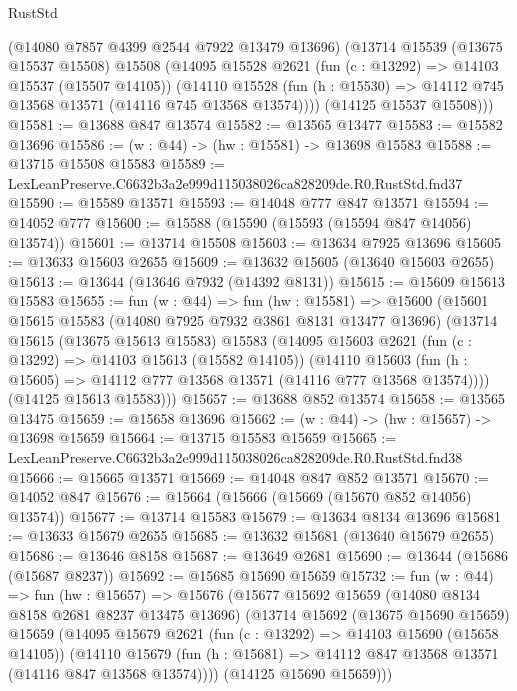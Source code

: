 \begin{lexlean}{RustStd}
\begin{coremodule}
      (@14080 @7857 @4399 @2544 @7922 @13479 @13696)
      (@13714
        @15539
        (@13675 @15537 @15508)
        @15508
        (@14095
          @15528
          @2621
          (fun (c : @13292) => @14103 @15537 (@15507 @14105))
          (@14110
            @15528
            (fun (h : @15530) => @14112 @745 @13568 @13571 (@14116 @745 @13568 @13574))))
        (@14125 @15537 @15508)))
@15581 := @13688 @847 @13574
@15582 := @13565 @13477
@15583 := @15582 @13696
@15586 := (w : @44) -> (hw : @15581) -> @13698 @15583
@15588 := @13715 @15508 @15583
@15589 := LexLeanPreserve.C6632b3a2e999d115038026ca828209de.R0.RustStd.fnd37
@15590 := @15589 @13571
@15593 := @14048 @777 @847 @13571
@15594 := @14052 @777
@15600 := @15588 (@15590 (@15593 (@15594 @847 @14056) @13574))
@15601 := @13714 @15508
@15603 := @13634 @7925 @13696
@15605 := @13633 @15603 @2655
@15609 := @13632 @15605 (@13640 @15603 @2655)
@15613 := @13644 (@13646 @7932 (@14392 @8131))
@15615 := @15609 @15613 @15583
@15655 := fun (w : @44) =>
  fun (hw : @15581) =>
  @15600
    (@15601
      @15615
      @15583
      (@14080 @7925 @7932 @3861 @8131 @13477 @13696)
      (@13714
        @15615
        (@13675 @15613 @15583)
        @15583
        (@14095
          @15603
          @2621
          (fun (c : @13292) => @14103 @15613 (@15582 @14105))
          (@14110
            @15603
            (fun (h : @15605) => @14112 @777 @13568 @13571 (@14116 @777 @13568 @13574))))
        (@14125 @15613 @15583)))
@15657 := @13688 @852 @13574
@15658 := @13565 @13475
@15659 := @15658 @13696
@15662 := (w : @44) -> (hw : @15657) -> @13698 @15659
@15664 := @13715 @15583 @15659
@15665 := LexLeanPreserve.C6632b3a2e999d115038026ca828209de.R0.RustStd.fnd38
@15666 := @15665 @13571
@15669 := @14048 @847 @852 @13571
@15670 := @14052 @847
@15676 := @15664 (@15666 (@15669 (@15670 @852 @14056) @13574))
@15677 := @13714 @15583
@15679 := @13634 @8134 @13696
@15681 := @13633 @15679 @2655
@15685 := @13632 @15681 (@13640 @15679 @2655)
@15686 := @13646 @8158
@15687 := @13649 @2681
@15690 := @13644 (@15686 (@15687 @8237))
@15692 := @15685 @15690 @15659
@15732 := fun (w : @44) =>
  fun (hw : @15657) =>
  @15676
    (@15677
      @15692
      @15659
      (@14080 @8134 @8158 @2681 @8237 @13475 @13696)
      (@13714
        @15692
        (@13675 @15690 @15659)
        @15659
        (@14095
          @15679
          @2621
          (fun (c : @13292) => @14103 @15690 (@15658 @14105))
          (@14110
            @15679
            (fun (h : @15681) => @14112 @847 @13568 @13571 (@14116 @847 @13568 @13574))))
        (@14125 @15690 @15659)))

\end{coremodule}
\end{lexlean}
